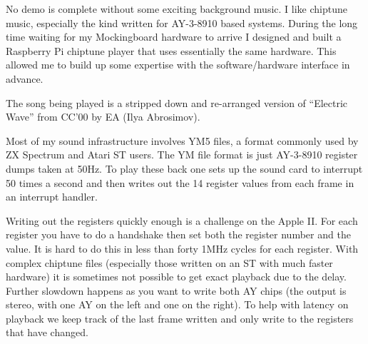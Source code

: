 \documentclass[twocolumn]{article}
\begin{document}
No demo is complete without some exciting background music.
I like chiptune music, especially the kind written
for AY-3-8910 based systems.
During the long time waiting for my Mockingboard hardware to arrive
I designed and built a Raspberry Pi chiptune player that uses
essentially the same hardware.
This allowed me to build up some expertise with the software/hardware
interface in advance.

The song being played is a stripped down and re-arranged version of
``Electric Wave'' from CC'00 by EA (Ilya Abrosimov). 

Most of my sound infrastructure involves YM5 files, a format commonly
used by ZX Spectrum and Atari ST users.
The YM file format is just AY-3-8910 register dumps taken at 50Hz.  
To play these back one sets up the sound card to interrupt 50 times a second
and then writes out the 14 register values from each frame in an interrupt
handler.


Writing out the registers quickly enough is a challenge on the Apple II.
For each register you have to do a handshake then set both the register 
number and the value.
It is hard to do this in less than forty 1MHz cycles for each register.
With complex chiptune files (especially those written on an ST with much
faster hardware) it is sometimes not possible to get exact playback
due to the delay.
Further slowdown happens as you want to write both AY chips (the output
is stereo, with one AY on the left and one on the right).
To help with latency on playback we keep track of the last frame written
and only write to the registers that have changed.

\end{document}
